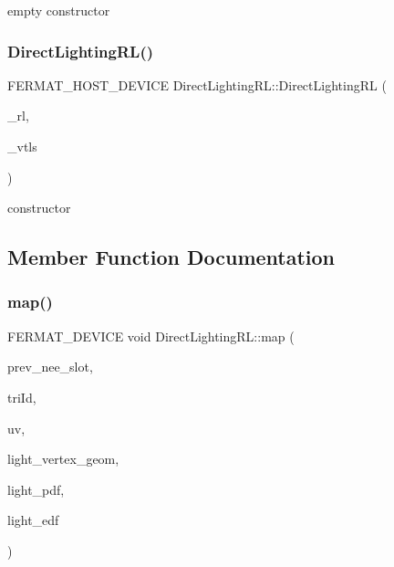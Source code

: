 empty constructor \mbox{\label{struct_direct_lighting_r_l_abbfe3a309d668177190c5dc5df992953}} 
\subsubsection{\texorpdfstring{Direct\+Lighting\+R\+L()}{DirectLightingRL()}\hspace{0.1cm}{\footnotesize\ttfamily [2/2]}}
{\footnotesize\ttfamily F\+E\+R\+M\+A\+T\+\_\+\+H\+O\+S\+T\+\_\+\+D\+E\+V\+I\+CE Direct\+Lighting\+R\+L\+::\+Direct\+Lighting\+RL (\begin{DoxyParamCaption}\item[{\hyperlink{struct_adaptive_clustered_r_l_view}{R\+L\+Map}}]{\+\_\+rl,  }\item[{\hyperlink{struct_v_t_l_mesh_view}{V\+T\+L\+Mesh\+View}}]{\+\_\+vtls }\end{DoxyParamCaption})\hspace{0.3cm}{\ttfamily [inline]}}

constructor 

\subsection{Member Function Documentation}
\mbox{\label{struct_direct_lighting_r_l_ac763ae9503e0dbb78f5618c70446f2e7}} 
\subsubsection{\texorpdfstring{map()}{map()}}
{\footnotesize\ttfamily F\+E\+R\+M\+A\+T\+\_\+\+D\+E\+V\+I\+CE void Direct\+Lighting\+R\+L\+::map (\begin{DoxyParamCaption}\item[{const uint32}]{prev\+\_\+nee\+\_\+slot,  }\item[{const uint32}]{tri\+Id,  }\item[{const \hyperlink{structcugar_1_1_vector}{cugar\+::\+Vector2f}}]{uv,  }\item[{const \hyperlink{struct_vertex_geometry}{Vertex\+Geometry}}]{light\+\_\+vertex\+\_\+geom,  }\item[{float $\ast$}]{light\+\_\+pdf,  }\item[{\hyperlink{struct_edf}{Edf} $\ast$}]{light\+\_\+edf }\end{DoxyParamCaption})\hspace{0.3cm}{\ttfamily [inline]}}


